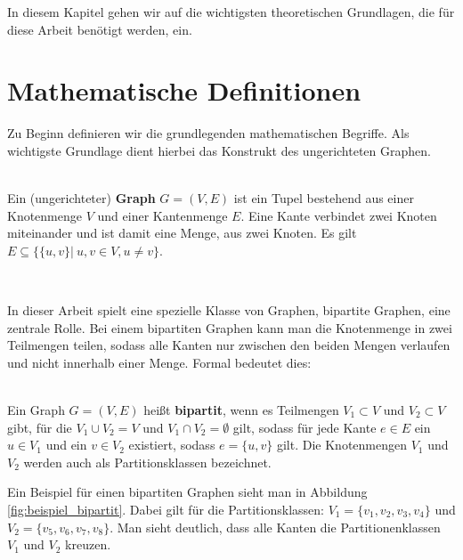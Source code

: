 

In diesem Kapitel gehen wir auf die wichtigsten theoretischen Grundlagen, die für diese
Arbeit benötigt werden, ein.


\section{Mathematische Definitionen}
Zu Beginn definieren wir die grundlegenden mathematischen Begriffe. Als wichtigste Grundlage dient 
hierbei das Konstrukt des ungerichteten Graphen.
\begin{definition}[Graph] ~\\
Ein (ungerichteter) \textbf{Graph} $G = (V,E)$ ist ein Tupel bestehend aus einer Knotenmenge $V$ und einer Kantenmenge
 $E$. Eine Kante verbindet zwei Knoten miteinander und ist damit eine Menge, aus zwei Knoten.
 Es gilt $E \subseteq \{ \{u,v\} |\ u,v \in V, u \neq v \}$.  
\end{definition}
\begin{definition}[Multigraph] ~\\
\end{definition}
\noindent
In dieser Arbeit spielt eine spezielle Klasse von Graphen, bipartite Graphen, eine zentrale Rolle.
Bei einem bipartiten Graphen kann man die Knotenmenge in zwei Teilmengen teilen, sodass alle Kanten nur zwischen den 
beiden Mengen verlaufen und nicht innerhalb einer Menge. Formal bedeutet dies:
\begin{definition} ~\\
Ein Graph $G=(V,E)$ heißt \textbf{bipartit}, wenn es Teilmengen $V_1 \subset V$ und $V_2 \subset V$ gibt, für die 
$V_1 \cup V_2 = V$ und $V_1 \cap V_2 = \emptyset$ gilt,
 sodass für jede Kante $e \in E$ ein $u \in V_1$ und ein $v \in V_2$ existiert, sodass $e = \{u,v\}$ gilt.
Die Knotenmengen $V_1$ und $V_2$ werden auch als Partitionsklassen bezeichnet.
\end{definition}

\noindent
Ein Beispiel für einen bipartiten Graphen sieht man in Abbildung \ref{fig:beispiel_bipartit}. Dabei gilt für die Partitionsklassen:
$V_1 = \{v_1,v_2,v_3,v_4\}$ und $V_2 = \{v_5,v_6,v_7,v_8\}$. Man sieht deutlich, dass alle Kanten die Partitionenklassen
$V_1$ und $V_2$ \glqq kreuzen\grqq.

